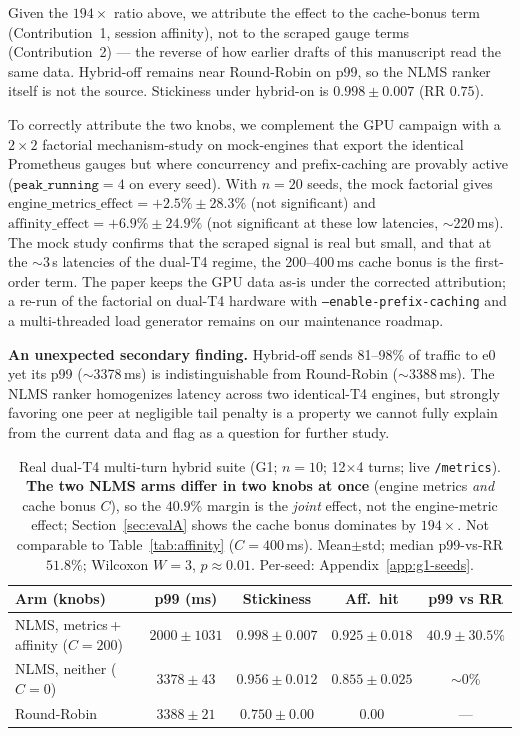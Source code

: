\documentclass[pdflatex,sn-mathphys-num]{sn-jnl}
\begin{document}
Given the $194{\times}$ ratio above, we attribute the effect to the cache-bonus
term (Contribution~1, session affinity), not to the scraped gauge terms
(Contribution~2) --- the reverse of how earlier drafts of this manuscript read the
same data. Hybrid-off remains near Round-Robin on p99, so the NLMS ranker itself is
not the source. Stickiness under hybrid-on is $0.998\pm0.007$ (RR $0.75$).

To correctly attribute the two knobs, we complement the GPU campaign with a
$2{\times}2$ factorial mechanism-study on mock-engines that export the identical
Prometheus gauges but where concurrency and prefix-caching are provably active
($\texttt{peak\_running}{=}4$ on every seed). With $n{=}20$ seeds, the mock
factorial gives $\text{engine\_metrics\_effect} = +2.5\% \pm 28.3\%$ (not
significant) and $\text{affinity\_effect} = +6.9\% \pm 24.9\%$ (not significant at
these low latencies, $\sim$220\,ms). The mock study confirms that the scraped
signal is real but small, and that at the $\sim$3\,s latencies of the dual-T4
regime, the 200--400\,ms cache bonus is the first-order term. The paper keeps the
GPU data as-is under the corrected attribution; a re-run of the factorial on
dual-T4 hardware with \texttt{--enable-prefix-caching} and a multi-threaded load
generator remains on our maintenance roadmap.

\textbf{An unexpected secondary finding.} Hybrid-off sends 81--98\% of traffic to
e0 yet its p99 ($\sim$3378\,ms) is indistinguishable from Round-Robin
($\sim$3388\,ms). The NLMS ranker homogenizes latency across two identical-T4
engines, but strongly favoring one peer at negligible tail penalty is a property
we cannot fully explain from the current data and flag as a question for further
study.

\begin{table}[!t]
\caption{Real dual-T4 multi-turn hybrid suite (G1; $n{=}10$; 12$\times$4 turns;
live \texttt{/metrics}). \textbf{The two NLMS arms differ in two knobs at once}
(engine metrics \emph{and} cache bonus $C$), so the $40.9\%$ margin is the
\emph{joint} effect, not the engine-metric effect; Section~\ref{sec:evalA} shows
the cache bonus dominates by $194{\times}$. Not comparable to
Table~\ref{tab:affinity} ($C{=}400$\,ms). Mean$\pm$std; median p99-vs-RR $51.8\%$;
Wilcoxon $W{=}3$, $p{\approx}0.01$. Per-seed: Appendix~\ref{app:g1-seeds}.}
\label{tab:hybrid}
\centering
\footnotesize
\begin{tabular}{@{}lcccc@{}}
\toprule
Arm (knobs) & p99 (ms) & Stickiness & Aff.\ hit & p99 vs RR \\
\midrule
NLMS, metrics\,+\,affinity ($C{=}200$) & $2000\pm1031$ & $0.998\pm0.007$ & $0.925\pm0.018$ & $\mathbf{40.9\pm30.5\%}$ \\
NLMS, neither ($C{=}0$) & $3378\pm43$ & $0.956\pm0.012$ & $0.855\pm0.025$ & $\sim$0\% \\
Round-Robin & $3388\pm21$ & $0.750\pm0.00$ & $0.00$ & --- \\
\bottomrule
\end{tabular}
\end{table}
\end{document}
